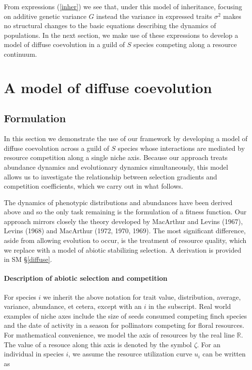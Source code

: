 \documentclass[]{elsarticle} %
\begin{document}
From expressions (\ref{inher}) we see that, under this model of
inheritance, focusing on additive genetic variance \(G\) instead the
variance in expressed traits \(\sigma^2\) makes no structural changes to
the basic equations describing the dynamics of populations. In the next
section, we make use of these expressions to develop a model of diffuse
coevolution in a guild of \(S\) species competing along a resource
continuum.

\hypertarget{a-model-of-diffuse-coevolution}{%
\section{\texorpdfstring{A model of diffuse coevolution
\label{coev}}{A model of diffuse coevolution }}\label{a-model-of-diffuse-coevolution}}

\hypertarget{formulation}{%
\subsection{\texorpdfstring{Formulation
\label{form_coev}}{Formulation }}\label{formulation}}

In this section we demonstrate the use of our framework by developing a
model of diffuse coevolution across a guild of \(S\) species whose
interactions are mediated by resource competition along a single niche
axis. Because our approach treats abundance dynamics and evolutionary
dynamics simultaneously, this model allows us to investigate the
relationship between selection gradients and competition coefficients,
which we carry out in what follows.

The dynamics of phenotypic distributions and abundances have been
derived above and so the only task remaining is the formulation of a
fitness function. Our approach mirrors closely the theory developed by
MacArthur and Levins (1967), Levins (1968) and MacArthur (1972, 1970,
1969). The most significant difference, aside from allowing evolution to
occur, is the treatment of resource quality, which we replace with a
model of abiotic stabilizing selection. A derivation is provided in SM
\S\ref{diffuse}.

\paragraph{Description of abiotic selection and competition}

For species \(i\) we inherit the above notation for trait value,
distribution, average, variance, abundance, et cetera, except with an
\(i\) in the subscript. Real world examples of niche axes include the
size of seeds consumed competing finch species and the date of activity
in a season for pollinators competing for floral resources. For
mathematical convenience, we model the axis of resources by the real
line \(\mathbb{R}\). The value of a resouce along this axis is denoted
by the symbol \(\zeta\). For an individual in species \(i\), we assume
the resource utilization curve \(u_i\) can be written as
\end{document}
